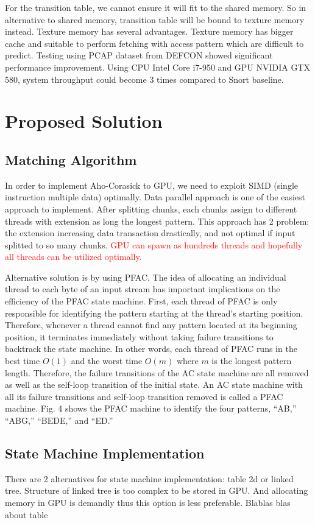 \documentclass[conference]{IEEEtran}
\begin{document}
        For the transition table, we cannot ensure it will fit to the shared memory. So in alternative to shared memory, transition table will be bound to texture memory instead. Texture memory has several advantages. Texture memory has bigger cache and suitable to perform fetching with access pattern which are difficult to predict. Testing using PCAP dataset from DEFCON showed significant performance improvement. Using CPU Intel Core i7-950 and GPU NVIDIA GTX 580, system throughput could become 3 times compared to Snort baseline.

\section{Proposed Solution}
    \subsection{Matching Algorithm}
        In order to implement Aho-Corasick to GPU, we need to exploit SIMD (single instruction multiple data) optimally. Data parallel approach is one of the easiest approach to implement. After splitting chunks, each chunks assign to different threads with extension as long the longest pattern. This approach has 2 problem: the extension increasing data transaction drastically, and not optimal if input splitted to so many chunks. \textcolor{red}{GPU can spawn as hundreds threads and hopefully all threads can be utilized optimally.}

        Alternative solution is by using PFAC. The idea of allocating an individual thread to each byte of an input stream has important implications on the efficiency of the PFAC state machine. First, each thread of PFAC is only responsible for identifying the pattern starting at the thread’s starting position. Therefore, whenever a thread cannot find any pattern located at its beginning position, it terminates immediately without taking failure transitions to backtrack the state machine. In other words, each thread of PFAC runs in the best time $O(1)$ and the worst time $O(m)$ where $m$ is the longest pattern length. Therefore, the failure transitions of the AC state machine are all removed as well as the self-loop transition of the initial state. An AC state machine with all its failure transitions and self-loop transition removed is called a PFAC machine. Fig. 4 shows the PFAC machine to identify the four patterns, “AB,” “ABG,” “BEDE,” and “ED.”

    \subsection{State Machine Implementation}
        There are 2 alternatives for state machine implementation: table 2d or linked tree. Structure of linked tree is too complex to be stored in GPU. And allocating memory in GPU is demandly thus this option is less preferable. 
        Blablas blas about table
\end{document}
